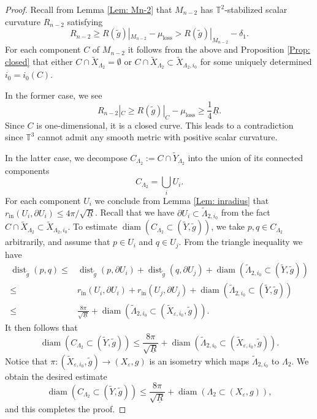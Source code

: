 \documentclass[11pt,letterpaper]{amsart}
\numberwithin{equation}{section}
\theoremstyle{definition}
\DeclareMathOperator{\dist}{dist}
\DeclareMathOperator{\diam}{diam}
\newcommand{\ve}{\varepsilon}
\newcommand{\ti}[1]{\tilde{#1}}
\begin{document}
\begin{proof}
Recall from Lemma \ref{Lem: Mn-2} that $M_{n-2}$ has $\mathbb T^2$-stabilized scalar curvature $R_{n-2}$ satisfying
$$
R_{n-2}\geq R(\tilde g)|_{M_{n-2}}-\mu_{\mathrm{loss}}>R(\tilde g)|_{M_{n-2}}-\delta_1.
$$
For each component $C$ of $M_{n-2}$ it follows from the above and Proposition \ref{Prop: closed} that either $C\cap \tilde X_{\Lambda_2}=\emptyset$ or $C\cap \tilde X_{\Lambda_2}\subset \tilde X_{\Lambda_2,i_0}$ for some uniquely determined $i_0=i_0(C)$.

In the former case, we see
$$
R_{n-2}|_C\geq R(\tilde g)|_C-\mu_{\mathrm{loss}}\geq \frac{1}{4}\underline R.
$$
Since $C$ is one-dimensional, it is a closed curve. This leads to a contradiction since $\mathbb T^3$ cannot admit any smooth metric with positive scalar curvature.

In the latter case, we decompose $C_{\Lambda_2}:= C\cap \tilde Y_{\Lambda_2}$ into the union of its connected components
$$
C_{\Lambda_2}=\bigcup_i U_i.
$$
For each component $U_i$ we conclude from Lemma \ref{Lem: inradius} that $r_{\mathrm{in}}(U_i,\partial U_i)\leq 4\pi/\sqrt{\underline R}$. Recall that we have $\partial U_i\subset \tilde\Lambda_{2,i_0}$ from the fact $C\cap \tilde X_{\Lambda_2}\subset \tilde X_{\Lambda_2,i_0}$.
To estimate $\diam(C_{\Lambda_2}\subset (\tilde Y,\tilde g))$, we take $p,q\in C_{\Lambda_2}$ arbitrarily, and assume that $p\in U_{i}$ and $q\in U_{j}$. From the triangle inequality we have
\[
\begin{split}
\dist_{\ti{g}}(p,q) \leq {} & \dist_{\ti{g}}(p,\partial U_{i})+\dist_{\ti{g}}(q,\partial U_{j})+\diam(\tilde \Lambda_{2,i_0}\subset(\ti{Y},\ti{g})) \\[1mm]
\leq {} & r_{\mathrm{in}}(U_{i},\partial U_{i})+r_{\mathrm{in}}(U_{j},\partial U_{j})+\diam(\tilde \Lambda_{2,i_0}\subset(\ti{Y},\ti{g})) \\
\leq {} & \frac{8\pi}{\sqrt{\underline R}}+\diam(\tilde \Lambda_{2,i_0}\subset (\tilde X_{\ve,i_0},\tilde g)).
\end{split}
\]
It then follows that
$$
\diam(C_{\Lambda_2}\subset (\tilde Y,\tilde g))\leq \frac{8\pi}{\sqrt{\underline R}}+\diam(\tilde \Lambda_{2,i_0}\subset (\tilde X_{\ve,i_0},\tilde g)).
$$
Notice that $\pi:(\tilde X_{\ve,i_0},\tilde g)\to(X_\ve,g)$ is an isometry which maps $\tilde \Lambda_{2,i_0}$ to $\Lambda_{2}$. We obtain the desired estimate
\begin{equation}\label{C Lambda 2 diameter estimate}
\diam(C_{\Lambda_2}\subset (\tilde Y,\tilde g))\leq \frac{8\pi}{\sqrt{\underline R}}+\diam(\Lambda_{2}\subset (X_{\ve},g)),
\end{equation}
and this completes the proof.
\end{proof}
\end{document}
